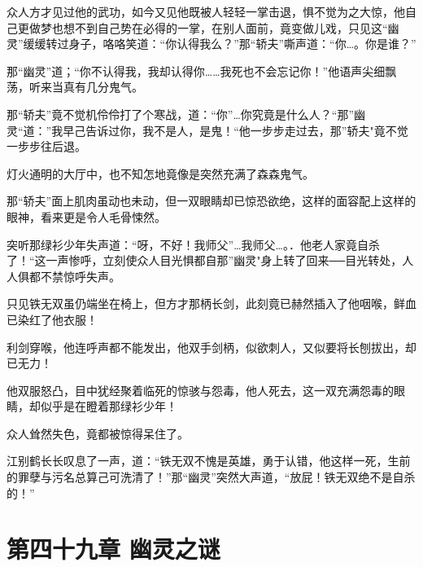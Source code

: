 \documentclass[12pt,oneside]{book}
\begin{document}
众人方才见过他的武功，如今又见他既被人轻轻一掌击退，惧不觉为之大惊，他自己更做梦也想不到自己势在必得的一掌，在别人面前，竟变做儿戏，只见这``幽灵''缓缓转过身子，咯咯笑道：``你认得我么？''那``轿夫''嘶声道：``你\ldots。你是谁？''

那``幽灵''道；``你不认得我，我却认得你\ldots\ldots 我死也不会忘记你！''他语声尖细飘荡，听来当真有几分鬼气。

那``轿夫''竟不觉机伶伶打了个寒战，道：``你''\ldots 你究竟是什么人？``那''幽灵``道：''我早己告诉过你，我不是人，是鬼！``他一步步走过去，那''轿夫"竟不觉一步步往后退。

灯火通明的大厅中，也不知怎地竟像是突然充满了森森鬼气。

那``轿夫''面上肌肉虽动也未动，但一双眼睛却已惊恐欲绝，这样的面容配上这样的眼神，看来更是令人毛骨悚然。

突听那绿衫少年失声道：``呀，不好！我师父''\ldots 我师父\ldots。．他老人家竟自杀了！``这一声惨呼，立刻使众人目光惧都自那''幽灵"身上转了回来──目光转处，人人俱都不禁惊呼失声。

只见铁无双虽仍端坐在椅上，但方才那柄长剑，此刻竟已赫然插入了他咽喉，鲜血已染红了他衣服！

利剑穿喉，他连呼声都不能发出，他双手剑柄，似欲刺人，又似要将长刨拔出，却已无力！

他双服怒凸，目中犹经聚着临死的惊骇与怨毒，他人死去，这一双充满怨毒的眼睛，却似乎是在瞪着那绿衫少年！

众人耸然失色，竟都被惊得呆住了。

江别鹤长长叹息了一声，道：``铁无双不愧是英雄，勇于认错，他这样一死，生前的罪孽与污名总算己可洗清了！''那``幽灵''突然大声道，``放屁！铁无双绝不是自杀的！''

\hypertarget{ux7b2cux56dbux5341ux4e5dux7ae0-ux5e7dux7075ux4e4bux8c1c}{%
\chapter{第四十九章
幽灵之谜}\label{ux7b2cux56dbux5341ux4e5dux7ae0-ux5e7dux7075ux4e4bux8c1c}}
\end{document}
